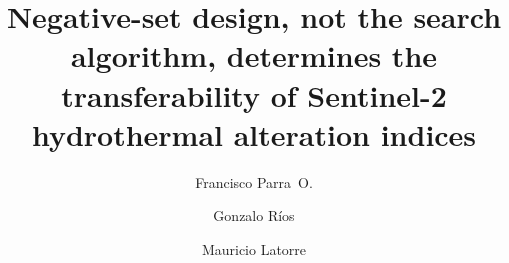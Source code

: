 \documentclass[preprint,authoryear,number]{elsarticle}
\begin{document}
\begin{frontmatter}

\title{Negative-set design, not the search algorithm, determines the transferability of Sentinel-2 hydrothermal alteration indices}

\author[usach]{Francisco Parra~O.}
\author[dim]{Gonzalo R\'ios}
\author[uoh,systemix,cgr,cmm,inta]{Mauricio Latorre}

\address[usach]{Universidad de Santiago de Chile (USACH), Santiago, Chile}
\address[dim]{Departamento de Ingenier\'ia Matem\'atica, Facultad de Ciencias F\'isicas y Matem\'aticas, Universidad de Chile, Santiago, Chile}
\address[uoh]{Laboratorio de Bioingenier\'ia, Instituto de Ciencias de la Ingenier\'ia, Universidad de O'Higgins, Libertador Bernardo O'Higgins 611, Rancagua, Chile}
\address[systemix]{Centro de Biolog\'ia de Sistemas para el Estudio de Comunidades Extrem\'ofilas de Relaves Mineros (SYSTEMIX), Universidad de O'Higgins, Rancagua, Chile}
\address[cgr]{Millennium Institute Center for Genome Regulation, Santiago 8320165, Chile}
\address[cmm]{Center for Mathematical Modeling, University of Chile, Beauchef 851, Santiago, Chile}
\address[inta]{Laboratorio de Bioinform\'atica y Expresi\'on G\'enica, INTA, Universidad de Chile, El L\'ibano 5524, Macul, Santiago, Chile}


\end{frontmatter}
\end{document}
